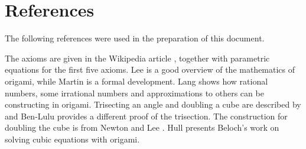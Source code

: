 
\newpage

\section{References}\label{s.ref}

The following references were used in the preparation of this document.

The axioms are given in the Wikipedia article \cite{hh}, together with parametric equations for the first five axioms. Lee \cite[Chapter~4]{hwa} is a good overview of the mathematics of origami, while Martin \cite[Chapter~10]{martin} is a formal development. Lang \cite{lang} shows how rational numbers, some irrational numbers and approximations to others can be constructing in origami. Trisecting an angle and doubling a cube are described by \cite{newton} and Ben-Lulu \cite{oriah} provides a different proof of the trisection. The construction for doubling the cube is from Newton \cite{newton} and Lee \cite{hwa}. Hull \cite{hull-beloch} presents Beloch's work on solving cubic equations with origami.

\renewcommand\refname{}

\vspace{-4ex}



